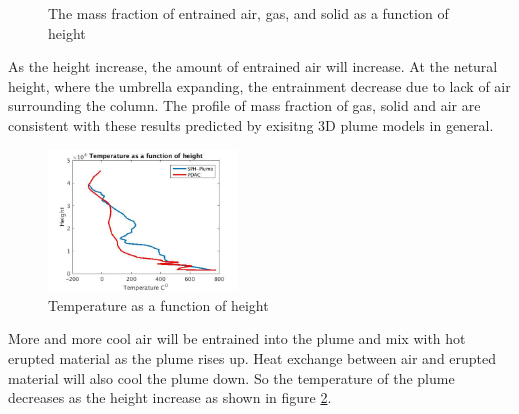 \documentclass[10pt,a4paper]{article}
\begin{document}
\begin{figure}
\hfill
{}
\hfill
{}
\hfill
{}
\hfill
\caption{The mass fraction of entrained air, gas, and solid as a function of height}
\label{fig:strong_plume_mass_fraction}
\end{figure}
As the height increase, the amount of entrained air will increase. At the netural height, where the umbrella expanding, the entrainment decrease due to lack of air surrounding the column. The profile of mass fraction of gas, solid and air are consistent with these results predicted by exisitng 3D plume models in general.
\begin{figure}
\center
\includegraphics[width=5cm]{Temp}
\caption{Temperature as a function of height}
\label{fig:strong_local_temp}
\end{figure}
More and more cool air will be entrained into the plume and mix with hot erupted material as the plume rises up. Heat exchange between air and erupted material will also cool the plume down. So the temperature of the plume decreases as the height increase as shown in figure \ref{fig:strong_local_temp}. 
\end{document}
